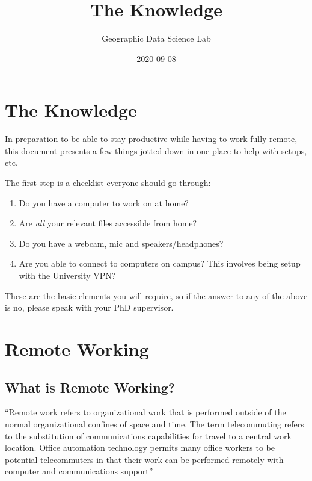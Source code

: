 \documentclass[
]{book}
\title{The Knowledge}
\author{Geographic Data Science Lab}
\date{2020-09-08}
\providecommand{\tightlist}{%
  \setlength{\itemsep}{0pt}\setlength{\parskip}{0pt}}
\begin{document}
\maketitle

{
\setcounter{tocdepth}{1}
\tableofcontents
}
\hypertarget{the-knowledge}{%
\chapter{The Knowledge}\label{the-knowledge}}

In preparation to be able to stay productive while having to work fully remote, this document presents a few things jotted down in one place to help with setups, etc.

The first step is a checklist everyone should go through:

\begin{enumerate}
\def\labelenumi{\arabic{enumi}.}
\tightlist
\item
  Do you have a computer to work on at home?
\item
  Are \emph{all} your relevant files accessible from home?
\item
  Do you have a webcam, mic and speakers/headphones?
\item
  Are you able to connect to computers on campus? This involves being setup with the University VPN?
\end{enumerate}

These are the basic elements you will require, so if the answer to any of the above is no, please speak with your PhD supervisor.

\hypertarget{remote-working}{%
\chapter{Remote Working}\label{remote-working}}

\hypertarget{what-is-remote-working}{%
\section{What is Remote Working?}\label{what-is-remote-working}}

``Remote work refers to organizational work that is performed outside of the normal organizational confines of space and time. The term telecommuting refers to the substitution of communications capabilities for travel to a central work location. Office automation technology permits many office workers to be potential telecommuters in that their work can be performed remotely with computer and communications support'' \citep{olson1983remote}
\end{document}

